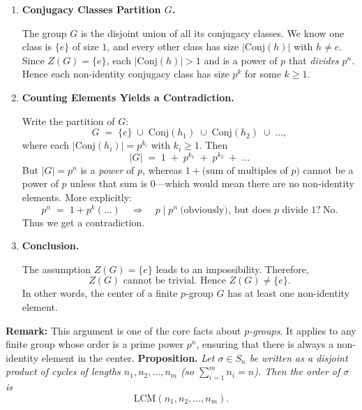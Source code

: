 \documentclass[12pt]{article}
\theoremstyle{definition} %
\theoremstyle{plain} %
\begin{document}
\begin{enumerate}
  \item \textbf{Conjugacy Classes Partition $G$.}

  The group $G$ is the disjoint union of all its conjugacy classes.  We know one class is $\{e\}$ of size $1$, and every other class has size $|\mathrm{Conj}(h)|$ with $h \neq e$.  Since $Z(G)=\{e\}$, each $|\mathrm{Conj}(h)| > 1$ and is a power of $p$ that \emph{divides} $p^n$. Hence each non-identity conjugacy class has size $p^k$ for some $k\ge 1$.

  \item \textbf{Counting Elements Yields a Contradiction.}

  Write the partition of $G$:
  \[
    G \;=\; \{e\} \;\cup\; \mathrm{Conj}(h_1) \;\cup\;\mathrm{Conj}(h_2)\;\cup\;\dots,
  \]
  where each $|\mathrm{Conj}(h_i)| = p^{k_i}$ with $k_i \ge 1$.  Then
  \[
    |G| \;=\; 1 \;+\; p^{k_1} \;+\; p^{k_2} \;+\; \dots
  \]
  But $|G| = p^n$ is a \emph{power} of $p$, whereas $1 + \bigl(\text{sum of multiples of }p\bigr)$ cannot be a power of $p$ unless that sum is $0$---which would mean there are no non-identity elements.  More explicitly:
  \[
    p^n \;=\; 1 + p^k(\dots) 
    \quad \Longrightarrow\quad
    p \mid p^n \ \text{(obviously)},\ \text{but does $p$ divide 1?} \ \text{No.}
  \]
  Thus we get a contradiction.

  \item \textbf{Conclusion.} 

  The assumption $Z(G) = \{e\}$ leads to an impossibility. Therefore,
  \[
    Z(G)\text{ cannot be trivial. Hence }Z(G)\neq \{e\}.
  \]
  In other words, the center of a finite $p$-group $G$ has at least one non-identity element.

\end{enumerate}

\noindent
\textbf{Remark:} 
This argument is one of the core facts about \emph{$p$-groups}. It applies to any finite group whose order is a prime power $p^n$, ensuring that there is always a non-identity element in the center.
\noindent
\textbf{Proposition.} 
\emph{Let $\sigma \in S_n$ be written as a disjoint product of cycles of lengths $n_1, n_2, \dots, n_m$ (so $\sum_{i=1}^m n_i = n$). Then the order of $\sigma$ is 
\[
\mathrm{LCM}(n_1, n_2, \dots, n_m).
\]}

\bigskip
\end{document}
